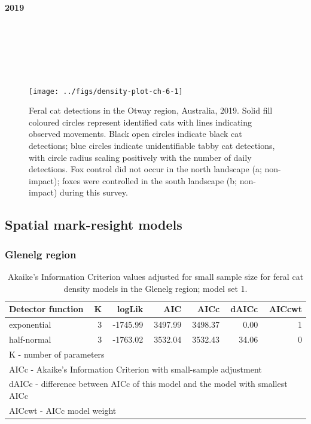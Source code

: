 \documentclass[preprint, 3p, authoryear]{elsarticle} %
\begin{document}
\newpage

\hypertarget{section-2}{%
\paragraph*{2019}\label{section-2}}

\(~\)

\(~\)

\(~\)

\begin{figure}

{\centering \texttt{[image: ../figs/density-plot-ch-6-1]} 

}

\caption{Feral cat detections in the Otway region, Australia, 2019. Solid fill coloured circles represent identified cats with lines indicating observed movements. Black open circles indicate black cat detections; blue circles indicate unidentifiable tabby cat detections, with circle radius scaling positively with the number of daily detections. Fox control did not occur in the north landscape (a; non-impact); foxes were controlled in the south landscape (b; non-impact) during this survey.}\label{fig:density-plot-ch-6}
\end{figure}

\newpage

\hypertarget{spatial-mark-resight-models}{%
\subsection{Spatial mark-resight models}\label{spatial-mark-resight-models}}

\hypertarget{glenelg-region-3}{%
\subsubsection{Glenelg region}\label{glenelg-region-3}}

\begingroup\fontsize{10}{12}\selectfont

\begin{longtable}[t]{lrrrrrr}
\caption{\label{tab:density-aic-g-1}Akaike's Information Criterion values adjusted for small sample size for feral cat density models in the Glenelg region; model set 1.}\\
\toprule
Detector function & K & logLik & AIC & AICc & dAICc & AICcwt\\
\midrule
exponential & 3 & -1745.99 & 3497.99 & 3498.37 & 0.00 & 1\\
half-normal & 3 & -1763.02 & 3532.04 & 3532.43 & 34.06 & 0\\
\bottomrule
\multicolumn{7}{l}{\rule{0pt}{1em}K - number of parameters}\\
\multicolumn{7}{l}{\rule{0pt}{1em}AICc - Akaike's Information Criterion with small-sample adjustment}\\
\multicolumn{7}{l}{\rule{0pt}{1em}dAICc - difference between AICc of this model and the model with smallest AICc}\\
\multicolumn{7}{l}{\rule{0pt}{1em}AICcwt - AICc model weight}\\
\end{longtable}
\endgroup{}
\end{document}
